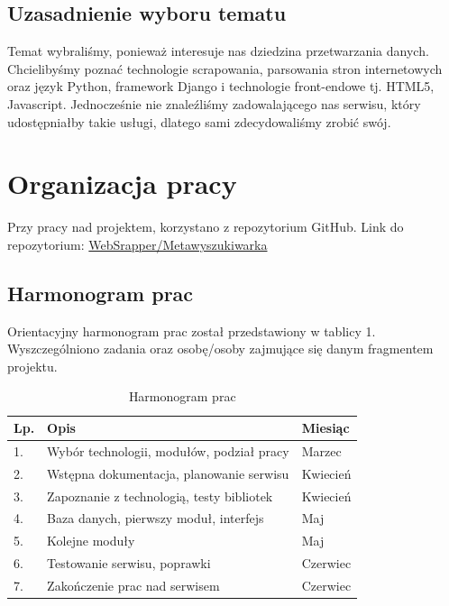 \documentclass[12pt, titlepage]{article}
\begin{document}
	\subsection{Uzasadnienie wyboru tematu}
	Temat wybraliśmy, ponieważ interesuje nas dziedzina przetwarzania danych. Chcielibyśmy poznać technologie scrapowania, parsowania stron internetowych oraz język Python, framework Django i technologie front-endowe tj. HTML5, Javascript. Jednocześnie nie znaleźliśmy zadowalającego nas serwisu, który udostępniałby takie usługi, dlatego sami zdecydowaliśmy zrobić swój.
	
	\newpage
	\section{Organizacja pracy}
	Przy pracy nad projektem, korzystano z repozytorium GitHub. Link do repozytorium: \newline
	\textcolor{blue}{\href{https://github.com/vizarch/projektPT}{WebSrapper/Metawyszukiwarka}}
	\subsection{Harmonogram prac}
	Orientacyjny harmonogram prac został przedstawiony w tablicy 1. Wyszczególniono zadania oraz osobę/osoby zajmujące się danym fragmentem projektu.
	\begin{table}[H]
		\setlength\extrarowheight{5pt}
		\centering
		\caption{Harmonogram prac}
		\label{harmonogram_prac}
		\begin{tabular}{ | C{2cm} | C{8cm} | C{6cm} | }
			\hline
			\textbf{Lp.} &	\textbf{Opis} &	\textbf{Miesiąc} \\ \hline

			1.& Wybór technologii, modułów, podział pracy & Marzec \\ \hline

			2.&	Wstępna dokumentacja, planowanie serwisu &	Kwiecień \\ \hline

			3.&	Zapoznanie z technologią, testy bibliotek &	Kwiecień \\ \hline

			4.&	Baza danych, pierwszy moduł, interfejs & Maj \\ \hline

			5.&	Kolejne moduły & Maj \\ \hline

			6.&	Testowanie serwisu, poprawki &	Czerwiec \\ \hline

			7.&	Zakończenie prac nad serwisem &	Czerwiec \\ \hline

		\end{tabular}
	\end{table}
	\newpage
\end{document}
